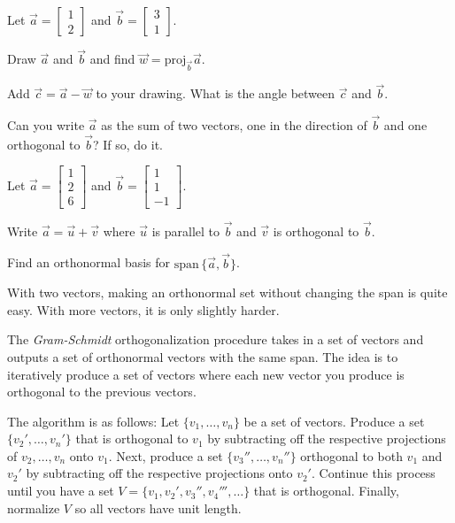 \documentclass[14pt]{problemset}
\newcommand{\proj}{\mathrm{proj}}
\renewcommand{\span}{\mathrm{span}\,}
\newcommand{\mat}[1]{\begin{bmatrix}#1\end{bmatrix}}
\begin{document}
	\question
	Let $\vec a=\mat{1\\2}$ and $\vec b=\mat{3\\1}$.
	\begin{parts}
		\item Draw $\vec a$ and $\vec b$ and find $\vec w=\proj_{\vec b}\vec a$.
		\item Add $\vec c=\vec a-\vec w$ to your drawing.  What is the angle between
			$\vec c$ and $\vec b$.
		\item Can you write $\vec a$ as the sum of two vectors, one in 
			the direction of $\vec b$ and one orthogonal to $\vec b$?
			If so, do it.
	\end{parts}

	\question
	Let $\vec a=\mat{1\\2\\6}$ and $\vec b=\mat{1\\1\\-1}$.
	\begin{parts}
		\item Write $\vec a=\vec u+\vec v$ where $\vec u$ is parallel to
			$\vec b$ and $\vec v$ is orthogonal to $\vec b$.
		\item Find an orthonormal basis for $\span\{\vec a,\vec b\}$.
	\end{parts}

	With two vectors, making an orthonormal set without changing the span
	is quite easy.  With more vectors, it is only slightly harder.


	\newpage
	\begin{definition}
		The \emph{Gram-Schmidt} orthogonalization procedure
		takes in a set of vectors and outputs a set of orthonormal vectors
		with the same span.  The idea is to iteratively produce a set of
		vectors where each new vector you produce is orthogonal to the previous vectors.

		The algorithm is as follows: Let $\{ v_1,\ldots, v_n\}$ be a set of 
		vectors.  Produce a set $\{ v_2',\ldots, v_n'\}$ that is orthogonal
		to $ v_1$ by subtracting off the respective projections
		of $ v_2,\ldots, v_n$
		onto $ v_1$.  Next, produce a set $\{ v_3'',\ldots, v_n''\}$
		orthogonal to both $ v_1$ and $ v_2'$ by subtracting off the
		respective projections
		onto $ v_2'$.  Continue this process until you have a set
		$V=\{ v_1, v_2', v_3'', v_4''',\ldots\}$ that is orthogonal.
		Finally, normalize $V$ so all vectors have unit length.
	\end{definition}
\end{document}
